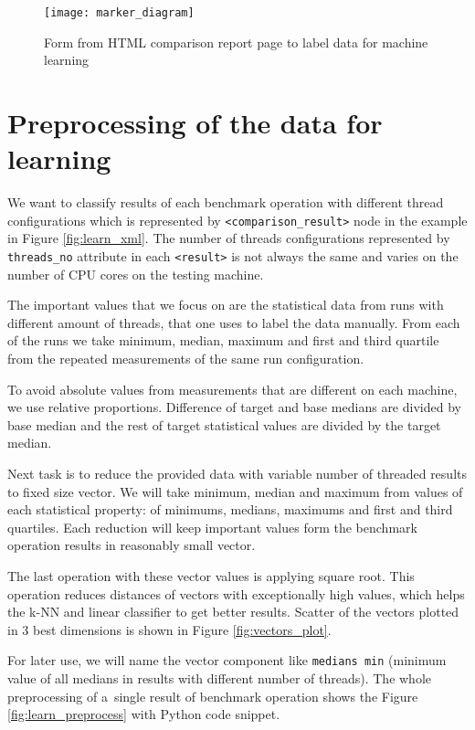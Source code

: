 \begin{figure}
  \centering
  \texttt{[image: marker\_diagram]}
  \caption{Form from HTML comparison report page to label data for machine learning}
  \label{fig:marker_diagram}
\end{figure}

\section{Preprocessing of the data for learning} \label{sec:learn_preprocess}
We want to classify results of each benchmark operation with
different thread configurations which is represented by
\texttt{<comparison\_result>} node in the example in Figure \ref{fig:learn_xml}.
The number of threads configurations represented by \texttt{threads\_no}
attribute in each \texttt{<result>} is not always the same and varies on the
number of CPU cores on the testing machine.

The important values that we focus on are the statistical data from runs with
different amount of threads, that one uses to label the data manually. From
each of the runs we take minimum, median, maximum and first and third quartile
from the repeated measurements of the same run configuration.

To avoid absolute values from measurements that are different on each machine,
we use relative proportions. Difference of target and base medians are
divided by base median and the rest of target statistical values are divided
by the target median.

Next task is to reduce the provided data with variable number of threaded results
to fixed size vector. We will take minimum, median and maximum from values of
each statistical property: of minimums, medians, maximums and first and third
quartiles. Each reduction will keep important values form the benchmark
operation results in reasonably small vector.

The last operation with these vector values is applying square root. This
operation reduces distances of vectors with exceptionally high values, which
helps the k-NN and linear classifier to get better results. Scatter of the
vectors plotted in 3 best dimensions is shown in Figure \ref{fig:vectors_plot}.

For later use, we will name the vector component like \texttt{medians min} 
(minimum value of all medians in results with different number of threads).
The whole preprocessing of a~single result of benchmark operation shows the
Figure \ref{fig:learn_preprocess} with Python code snippet.

